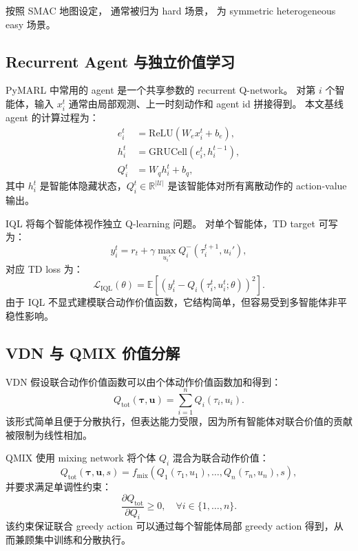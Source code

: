 按照 SMAC 地图设定， 通常被归为 hard 场景， 为 symmetric heterogeneous easy 场景。

\subsection{Recurrent Agent 与独立价值学习}

PyMARL 中常用的 agent 是一个共享参数的 recurrent Q-network。
对第 \(i\) 个智能体，输入 \(x_i^t\) 通常由局部观测、上一时刻动作和 agent id 拼接得到。
本文基线 agent 的计算过程为：
\begin{align}
  e_i^t &= \mathrm{ReLU}(W_e x_i^t+b_e), \\
  h_i^t &= \mathrm{GRUCell}(e_i^t, h_i^{t-1}), \\
  Q_i^t &= W_q h_i^t+b_q ,
\end{align}
其中 \(h_i^t\) 是智能体隐藏状态，\(Q_i^t \in \mathbb{R}^{|\mathcal{U}|}\) 是该智能体对所有离散动作的 action-value 输出。

IQL 将每个智能体视作独立 Q-learning 问题。
对单个智能体，TD target 可写为：
\begin{equation}
  y_i^t =
  r_t + \gamma
  \max_{u_i'}
  Q_i^{-}(\tau_i^{t+1}, u_i'),
\end{equation}
对应 TD loss 为：
\begin{equation}
  \mathcal{L}_{\mathrm{IQL}}(\theta)
  =
  \mathbb{E}
  \left[
    \left(
      y_i^t - Q_i(\tau_i^t,u_i^t;\theta)
    \right)^2
  \right].
\end{equation}
由于 IQL 不显式建模联合动作价值函数，它结构简单，但容易受到多智能体非平稳性影响。

\subsection{VDN 与 QMIX 价值分解}

VDN 假设联合动作价值函数可以由个体动作价值函数加和得到：
\begin{equation}
  Q_{\mathrm{tot}}(\boldsymbol{\tau},\mathbf{u})
  =
  \sum_{i=1}^{n} Q_i(\tau_i,u_i).
\end{equation}
该形式简单且便于分散执行，但表达能力受限，因为所有智能体对联合价值的贡献被限制为线性相加。

QMIX 使用 mixing network 将个体 \(Q_i\) 混合为联合动作价值：
\begin{equation}
  Q_{\mathrm{tot}}(\boldsymbol{\tau},\mathbf{u},s)
  =
  f_{\mathrm{mix}}
  \left(
    Q_1(\tau_1,u_1),\ldots,Q_n(\tau_n,u_n),s
  \right),
\end{equation}
并要求满足单调性约束：
\begin{equation}
  \frac{\partial Q_{\mathrm{tot}}}{\partial Q_i} \ge 0,
  \quad
  \forall i \in \{1,\ldots,n\}.
\end{equation}
该约束保证联合 greedy action 可以通过每个智能体局部 greedy action 得到，从而兼顾集中训练和分散执行。

